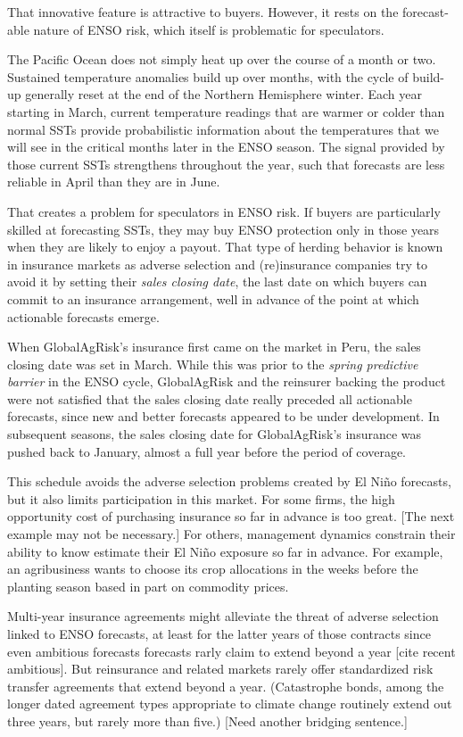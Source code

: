 \documentclass[authoryear]{article}
\begin{document}
\begin{itemize}
That innovative feature is attractive to buyers. However, it rests on the forecast-able nature of ENSO risk, which itself is problematic for speculators. 

The Pacific Ocean does not simply heat up over the course of a month or two. Sustained temperature anomalies build up over months, with the cycle of build-up generally reset at the end of the Northern Hemisphere winter. Each year starting in March, current temperature readings that are warmer or colder than normal SSTs provide probabilistic information about the temperatures that we will see in the critical months later in the ENSO season. The signal provided by those current SSTs strengthens throughout the year, such that forecasts are less reliable in April than they are in June.

That creates a problem for speculators in ENSO risk. If buyers are particularly skilled at forecasting SSTs, they may buy ENSO protection only in those years when they are likely to enjoy a payout. That type of herding behavior is known in insurance markets as adverse selection and (re)insurance companies try to avoid it by setting their \emph{sales closing date}, the last date on which buyers can commit to an insurance arrangement, well in advance of the point at which actionable forecasts emerge. 

When GlobalAgRisk's insurance first came on the market in Peru, the sales closing date was set in March. While this was prior to the \emph{spring predictive barrier} in the ENSO cycle, GlobalAgRisk and the reinsurer backing the product were not satisfied that the sales closing date really preceded all actionable forecasts, since new and better forecasts appeared to be under development. In subsequent seasons, the sales closing date for GlobalAgRisk's insurance was pushed back to January, almost a full year before the period of coverage.

This schedule avoids the adverse selection problems created by El Ni\~no forecasts, but it also limits participation in this market. For some firms, the high opportunity cost of purchasing insurance so far in advance is too great. [The next example may not be necessary.] For others, management dynamics constrain their ability to know estimate their El Ni\~no exposure so far in advance. For example, an agribusiness wants to choose its crop allocations in the weeks before the planting season based in part on commodity prices.

Multi-year insurance agreements might alleviate the threat of adverse selection linked to ENSO forecasts, at least for the latter years of those contracts since even ambitious forecasts forecasts rarly claim to extend beyond a year [cite recent ambitious]. But reinsurance and related markets rarely offer standardized risk transfer agreements that extend beyond a year. (Catastrophe bonds, among the longer dated agreement types appropriate to climate change routinely extend out three years, but rarely more than five.) [Need another bridging sentence.] 


\end{itemize}
\end{document}
